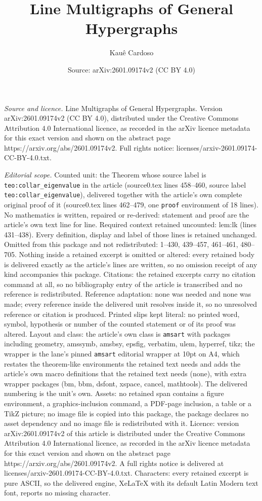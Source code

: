 \documentclass[10pt,a4paper]{amsart}
\title[Line Multigraphs of General Hypergraphs]{Line Multigraphs of General Hypergraphs}
\author{Kau\^e Cardoso}
\date{Source: arXiv:2601.09174v2 (CC BY 4.0)}
\begin{document}
\maketitle

\noindent\emph{Source and licence.} Line Multigraphs of General Hypergraphs. Version arXiv:2601.09174v2 (CC BY 4.0), distributed under the Creative Commons Attribution 4.0 International licence, as recorded in the arXiv licence metadata for this exact version and shown on the abstract page https://arxiv.org/abs/2601.09174v2. Full rights notice: licenses/arxiv-2601.09174-CC-BY-4.0.txt.\par\smallskip

\noindent\textit{Editorial scope.} Counted unit: the Theorem whose source label is \texttt{teo:collar\_eigenvalue} in the article (source0.tex lines 458--460, source label \texttt{teo:collar\_eigenvalue}), delivered together with the article's own complete original proof of it (source0.tex lines 462--479, one \texttt{proof} environment of 18 lines). No mathematics is written, repaired or re-derived: statement and proof are the article's own text line for line. Required context retained uncounted: lem:lk (lines 431--438). Every definition, display and label of those lines is retained unchanged. Omitted from this package and not redistributed: 1--430, 439--457, 461--461, 480--705. Nothing inside a retained excerpt is omitted or altered: every retained body is delivered exactly as the article's lines are written, so no omission receipt of any kind accompanies this package. Citations: the retained excerpts carry no citation command at all, so no bibliography entry of the article is transcribed and no reference is redistributed. Reference adaptation: none was needed and none was made; every reference inside the delivered unit resolves inside it, so no unresolved reference or citation is produced. Printed slips kept literal: no printed word, symbol, hypothesis or number of the counted statement or of its proof was altered. Layout and class: the article's own class is \texttt{amsart} with packages including geometry, amssymb, amsbsy, epsfig, verbatim, ulem, hyperref, tikz; the wrapper is the lane's pinned \texttt{amsart} editorial wrapper at 10pt on A4, which restates the theorem-like environments the retained text needs and adds the article's own macro definitions that the retained text needs (none), with extra wrapper packages (bm, bbm, dsfont, xspace, cancel, mathtools). The delivered numbering is the unit's own. Assets: no retained span contains a figure environment, a graphics-inclusion command, a PDF-page inclusion, a table or a TikZ picture; no image file is copied into this package, the package declares no asset dependency and no image file is redistributed with it. Licence: version arXiv:2601.09174v2 of this article is distributed under the Creative Commons Attribution 4.0 International licence, as recorded in the arXiv licence metadata for this exact version and shown on the abstract page https://arxiv.org/abs/2601.09174v2. A full rights notice is delivered at licenses/arxiv-2601.09174-CC-BY-4.0.txt. Characters: every retained excerpt is pure ASCII, so the delivered engine, XeLaTeX with its default Latin Modern text font, reports no missing character.
\end{document}
